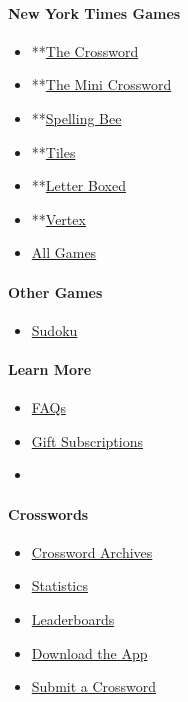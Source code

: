 \hypertarget{new-york-times-games-1}{%
\paragraph{New York Times Games}\label{new-york-times-games-1}}

\begin{itemize}
\tightlist
\item
  **\href{/crosswords/game/daily}{The Crossword}
\item
  **\href{/crosswords/game/mini}{The Mini Crossword}
\item
  **\href{/puzzles/spelling-bee}{Spelling Bee}
\item
  **\href{/puzzles/tiles}{Tiles}
\item
  **\href{/puzzles/letter-boxed}{Letter Boxed}
\item
  **\href{/puzzles/vertex}{Vertex}
\item
  \href{/crosswords}{All Games}
\end{itemize}

\hypertarget{other-games-1}{%
\paragraph{Other Games}\label{other-games-1}}

\begin{itemize}
\tightlist
\item
  \href{/puzzles/sudoku}{Sudoku}
\end{itemize}

\hypertarget{learn-more}{%
\paragraph{Learn More}\label{learn-more}}

\begin{itemize}
\item
  \href{https://nytimes.com/content/help/games/crosswords/crosswords.html}{FAQs}
\item
  \href{https://nytimes.com/subscription/games/lp3HLK7.html}{Gift
  Subscriptions}
\item
\end{itemize}

\hypertarget{crosswords}{%
\paragraph{Crosswords}\label{crosswords}}

\begin{itemize}
\tightlist
\item
  \href{/crosswords/archive}{Crossword Archives}
\item
  \href{/puzzles/stats}{Statistics}
\item
  \href{/puzzles/leaderboards}{Leaderboards}
\item
  \href{/crosswords/apps}{Download the App}
\item
  \href{/puzzles/submissions/crossword}{Submit a Crossword}
\end{itemize}

